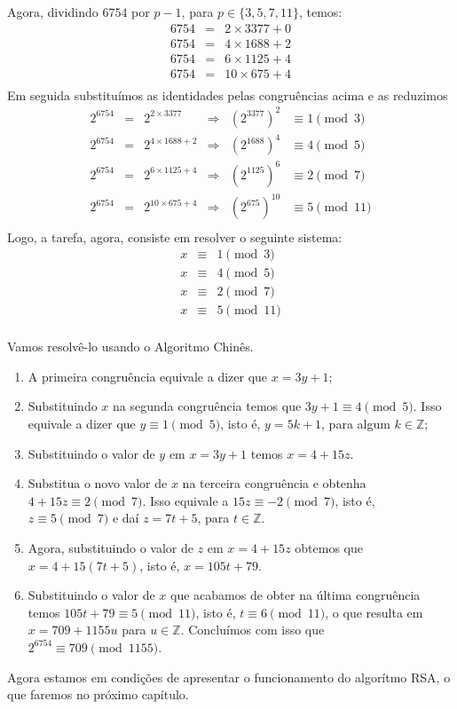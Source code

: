 Agora, dividindo $6754$ por $p-1$, para $p\in\{3, 5, 7, 11\}$, temos:
\[
\begin{array}{ccl}
  6754 & = & 2 \times 3377 + 0 \\  
	6754 & = & 4 \times 1688 + 2 \\
  6754 & = & 6 \times 1125 + 4 \\
  6754 & = & 10 \times 675 + 4 \\ 
\end{array}
\]
Em seguida substitu\'imos as identidades pelas congru\^encias acima e as reduzimos
\[
\begin{array}{cccccc}
2^{6754} & = & 2^{2\times 3377}   & \Rightarrow & (2^{3377})^{2} & \equiv 1 \pmod{3} \\  
2^{6754} & = & 2^{4\times 1688+2} & \Rightarrow & (2^{1688})^{4} & \equiv 4 \pmod{5}\\  
2^{6754} & = & 2^{6\times 1125+4} & \Rightarrow & (2^{1125})^{6} & \equiv 2 \pmod{7}\\ 
2^{6754} & = & 2^{10\times 675+4} & \Rightarrow & (2^{675})^{10} & \equiv 5 \pmod{11}\\  
\end{array}
\]
Logo, a tarefa, agora, consiste em resolver o seguinte sistema:
\[
\begin{array}{ccc}
  x & \equiv & 1 \pmod{3}\\
  x & \equiv & 4 \pmod{5}\\
  x & \equiv & 2 \pmod{7}\\
  x & \equiv & 5 \pmod{11}\\  
\end{array}
\]

Vamos resolvê-lo usando o Algoritmo Chin\^{e}s. 
\begin{enumerate}
\item A primeira congru\^{e}ncia equivale a dizer que $x = 3y + 1$; 
\item Substituindo $x$ na segunda congru\^encia temos que $3y + 1 \equiv 4 \pmod{5}$. Isso equivale a dizer que $y \equiv 1 \pmod{5}$, 
isto \'{e}, $y=5k+1$, para algum $k\in\mathbb{Z}$; 
\item Substituindo o valor de $y$ em $x=3y+1$ temos $x=4+15z$.
\item Substitua o novo valor de $x$ na terceira congru\^{e}ncia e obtenha $4+15z\equiv 2\pmod{7}$. Isso equivale a
      $15z\equiv -2\pmod{7}$, isto \'{e}, $z\equiv 5\pmod{7}$ e da\'{i} $z=7t+5$, para $t\in\mathbb{Z}$.
\item Agora, substituindo o valor de $z$ em $x=4+15z$ obtemos que $x=4+15(7t+5)$, isto \'{e}, $x=105t+79$.
\item Substituindo o valor de $x$ que acabamos de obter na \'{u}ltima congru\^{e}ncia temos 
      $105t+79\equiv 5 \pmod{11}$, isto \'{e},  $t\equiv 6 \pmod{11}$, o que resulta em 
				$x = 709+1155u$ para $u\in\mathbb{Z}$. Conclu\'imos com isso que $2^{6754} \equiv 709 \pmod{1155}$.
\end{enumerate}

Agora estamos em condi\c{c}\~{o}es de apresentar o funcionamento do algor\'{i}tmo RSA, o que faremos no pr\'{o}ximo cap\'{i}tulo. 